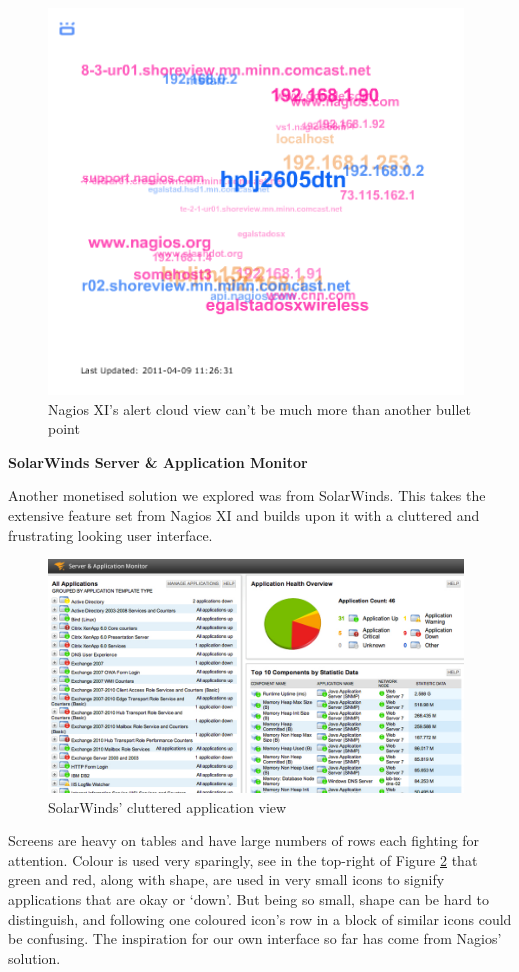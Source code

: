 \documentclass{l3proj}
\begin{document}
\begin{figure}[H]
\centering
\includegraphics[width=110mm]{Competitors/NagiosXI_alertcloud.png}
\caption{Nagios XI's alert cloud view can't be much more than another bullet point}
\label{fig:NagiosAlertCloud}
\end{figure}

\textbf{SolarWinds Server \& Application Monitor} \cite{solarwinds}

Another monetised solution we explored was from SolarWinds. This takes the extensive feature set from Nagios XI and builds upon it with a cluttered and frustrating looking user interface.

\begin{figure}[H]
\centering
\includegraphics[width=110mm]{Competitors/SolarWinds_AppView.jpg}
\caption{SolarWinds' cluttered application view}
\label{fig:SWAppView}
\end{figure}

Screens are heavy on tables and have large numbers of rows each fighting for attention. Colour is used very sparingly, see in the top-right of Figure \ref{fig:SWAppView} that green and red, along with shape, are used in very small icons to signify applications that are okay or `down'. But being so small, shape can be hard to distinguish, and following one coloured icon's row in a block of similar icons could be confusing. The inspiration for our own interface so far has come from Nagios' solution.
\end{document}

